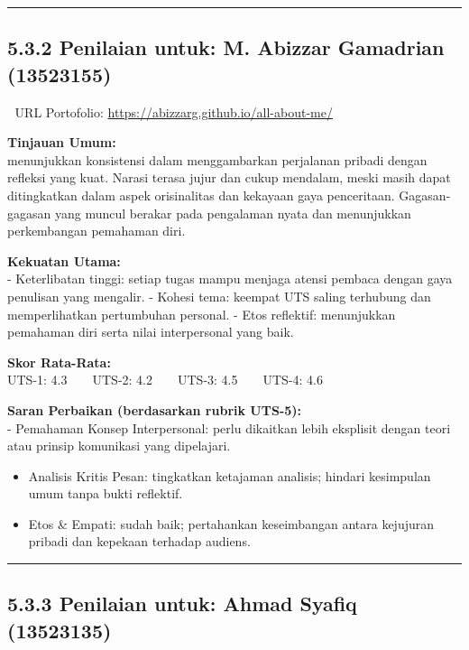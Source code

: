 \documentclass[
  letterpaper,
  DIV=11,
  numbers=noendperiod]{scrreprt}
\begin{document}
\begin{center}\rule{0.5\linewidth}{0.5pt}\end{center}

\subsection{5.3.2 Penilaian untuk: M. Abizzar Gamadrian
(13523155)}\label{penilaian-untuk-m.-abizzar-gamadrian-13523155}

🔗 URL Portofolio: \url{https://abizzarg.github.io/all-about-me/}

\textbf{Tinjauan Umum:}\\
menunjukkan konsistensi dalam menggambarkan perjalanan pribadi dengan
refleksi yang kuat. Narasi terasa jujur dan cukup mendalam, meski masih
dapat ditingkatkan dalam aspek orisinalitas dan kekayaan gaya
penceritaan. Gagasan-gagasan yang muncul berakar pada pengalaman nyata
dan menunjukkan perkembangan pemahaman diri.

\textbf{Kekuatan Utama:}\\
- Keterlibatan tinggi: setiap tugas mampu menjaga atensi pembaca dengan
gaya penulisan yang mengalir. - Kohesi tema: keempat UTS saling
terhubung dan memperlihatkan pertumbuhan personal. - Etos reflektif:
menunjukkan pemahaman diri serta nilai interpersonal yang baik.

\textbf{Skor Rata-Rata:}\\
UTS-1: 4.3 \textbar{} UTS-2: 4.2 \textbar{} UTS-3: 4.5 \textbar{} UTS-4:
4.6

\textbf{Saran Perbaikan (berdasarkan rubrik UTS-5):}\\
- Pemahaman Konsep Interpersonal: perlu dikaitkan lebih eksplisit dengan
teori atau prinsip komunikasi yang dipelajari.

\begin{itemize}
\item
  Analisis Kritis Pesan: tingkatkan ketajaman analisis; hindari
  kesimpulan umum tanpa bukti reflektif.
\item
  Etos \& Empati: sudah baik; pertahankan keseimbangan antara kejujuran
  pribadi dan kepekaan terhadap audiens.
\end{itemize}

\begin{center}\rule{0.5\linewidth}{0.5pt}\end{center}

\subsection{5.3.3 Penilaian untuk: Ahmad Syafiq
(13523135)}\label{penilaian-untuk-ahmad-syafiq-13523135}
\end{document}
